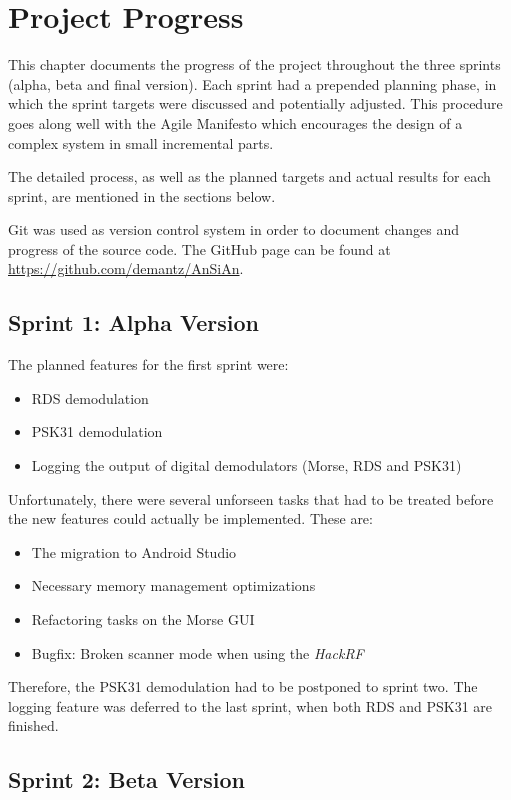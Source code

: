 \chapter{Project Progress\label{ch:project_progress}}

This chapter documents the progress of the project throughout the three
sprints (alpha, beta and final version). Each sprint had a pre\-pen\-ded
planning phase, in which the sprint targets were discussed and potentially
adjusted. This procedure goes along well with the Agile Manifesto which
encourages the design of a complex system in small incremental parts.

The detailed process, as well as the planned targets and actual
results for each sprint, are mentioned in the sections below.

Git was used as version control system in order to document changes and
progress of the source code. The GitHub page can be found at
\url{https://github.com/demantz/AnSiAn}.

\section{Sprint 1: Alpha Version}

The planned features for the first sprint were:
\begin{itemize}
	\item RDS demodulation
	\item PSK31 demodulation
	\item Logging the output of digital demodulators (Morse, RDS and PSK31)
\end{itemize}

Unfortunately, there were several unforseen tasks that had to be treated
before the new features could actually be implemented. These are:
\begin{itemize}
	\item The migration to Android Studio
	\item Necessary memory management optimizations
	\item Refactoring tasks on the Morse \ac{GUI}
	\item Bugfix: Broken scanner mode when using the \emph{HackRF}
\end{itemize}

Therefore, the PSK31 demodulation had to be postponed to sprint two. The
logging feature was deferred to the last sprint, when both RDS and
PSK31 are finished.


\section{Sprint 2: Beta Version}

